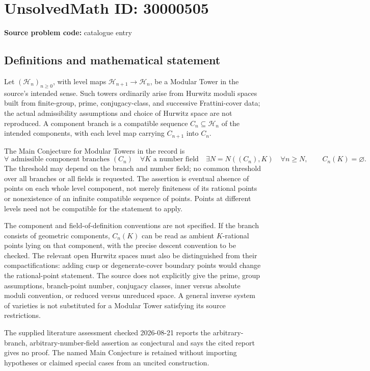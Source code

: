 \documentclass[11pt]{article}
\begin{document}
\section*{UnsolvedMath ID: 30000505}
\textbf{Source problem code:} catalogue entry
\subsection{Definitions and mathematical statement}
Let \((\mathcal H_n)_{n\geq0}\), with level maps \(\mathcal H_{n+1}\to\mathcal H_n\), be a Modular Tower in the source's intended sense. Such towers ordinarily arise from Hurwitz moduli spaces built from finite-group, prime, conjugacy-class, and successive Frattini-cover data; the actual admissibility assumptions and choice of Hurwitz space are not reproduced. A component branch is a compatible sequence \(C_n\subseteq\mathcal H_n\) of the intended components, with each level map carrying \(C_{n+1}\) into \(C_n\).

The Main Conjecture for Modular Towers in the record is
\[
\forall\text{ admissible component branches }(C_n)\quad
\forall K\text{ a number field}\quad
\exists N=N((C_n),K)\quad
\forall n\geq N,\qquad C_n(K)=\varnothing.
\]
The threshold may depend on the branch and number field; no common threshold over all branches or all fields is requested. The assertion is eventual absence of points on each whole level component, not merely finiteness of its rational points or nonexistence of an infinite compatible sequence of points. Points at different levels need not be compatible for the statement to apply.

The component and field-of-definition conventions are not specified. If the branch consists of geometric components, \(C_n(K)\) can be read as ambient \(K\)-rational points lying on that component, with the precise descent convention to be checked. The relevant open Hurwitz spaces must also be distinguished from their compactifications: adding cusp or degenerate-cover boundary points would change the rational-point statement. The source does not explicitly give the prime, group assumptions, branch-point number, conjugacy classes, inner versus absolute moduli convention, or reduced versus unreduced space. A general inverse system of varieties is not substituted for a Modular Tower satisfying its source restrictions.

The supplied literature assessment checked 2026-08-21 reports the arbitrary-branch, arbitrary-number-field assertion as conjectural and says the cited report gives no proof. The named Main Conjecture is retained without importing hypotheses or claimed special cases from an uncited construction.
\end{document}
